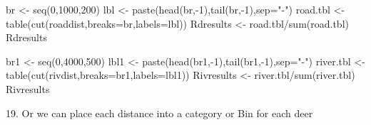 \documentclass[
  letterpaper,
]{book}
\newenvironment{Shaded}{\begin{snugshade}}{\end{snugshade}}
\newcommand{\AttributeTok}[1]{\textcolor[rgb]{0.40,0.45,0.13}{#1}}
\newcommand{\DecValTok}[1]{\textcolor[rgb]{0.68,0.00,0.00}{#1}}
\newcommand{\FunctionTok}[1]{\textcolor[rgb]{0.28,0.35,0.67}{#1}}
\newcommand{\NormalTok}[1]{\textcolor[rgb]{0.00,0.23,0.31}{#1}}
\newcommand{\OtherTok}[1]{\textcolor[rgb]{0.00,0.23,0.31}{#1}}
\newcommand{\SpecialCharTok}[1]{\textcolor[rgb]{0.37,0.37,0.37}{#1}}
\newcommand{\StringTok}[1]{\textcolor[rgb]{0.13,0.47,0.30}{#1}}
\begin{document}
\begin{Shaded}
\begin{Highlighting}[]
\NormalTok{br }\OtherTok{\textless{}{-}} \FunctionTok{seq}\NormalTok{(}\DecValTok{0}\NormalTok{,}\DecValTok{1000}\NormalTok{,}\DecValTok{200}\NormalTok{)}
\NormalTok{lbl }\OtherTok{\textless{}{-}} \FunctionTok{paste}\NormalTok{(}\FunctionTok{head}\NormalTok{(br,}\SpecialCharTok{{-}}\DecValTok{1}\NormalTok{),}\FunctionTok{tail}\NormalTok{(br,}\SpecialCharTok{{-}}\DecValTok{1}\NormalTok{),}\AttributeTok{sep=}\StringTok{"{-}"}\NormalTok{)}
\NormalTok{road.tbl }\OtherTok{\textless{}{-}} \FunctionTok{table}\NormalTok{(}\FunctionTok{cut}\NormalTok{(roaddist,}\AttributeTok{breaks=}\NormalTok{br,}\AttributeTok{labels=}\NormalTok{lbl))}
\NormalTok{Rdresults }\OtherTok{\textless{}{-}}\NormalTok{ road.tbl}\SpecialCharTok{/}\FunctionTok{sum}\NormalTok{(road.tbl)}
\NormalTok{Rdresults}

\NormalTok{br1 }\OtherTok{\textless{}{-}} \FunctionTok{seq}\NormalTok{(}\DecValTok{0}\NormalTok{,}\DecValTok{4000}\NormalTok{,}\DecValTok{500}\NormalTok{)}
\NormalTok{lbl1 }\OtherTok{\textless{}{-}} \FunctionTok{paste}\NormalTok{(}\FunctionTok{head}\NormalTok{(br1,}\SpecialCharTok{{-}}\DecValTok{1}\NormalTok{),}\FunctionTok{tail}\NormalTok{(br1,}\SpecialCharTok{{-}}\DecValTok{1}\NormalTok{),}\AttributeTok{sep=}\StringTok{"{-}"}\NormalTok{)}
\NormalTok{river.tbl }\OtherTok{\textless{}{-}} \FunctionTok{table}\NormalTok{(}\FunctionTok{cut}\NormalTok{(rivdist,}\AttributeTok{breaks=}\NormalTok{br1,}\AttributeTok{labels=}\NormalTok{lbl1))}
\NormalTok{Rivresults }\OtherTok{\textless{}{-}}\NormalTok{ river.tbl}\SpecialCharTok{/}\FunctionTok{sum}\NormalTok{(river.tbl)}
\NormalTok{Rivresults}
\end{Highlighting}
\end{Shaded}

19. Or we can place each distance into a category or Bin for each deer
\end{document}
